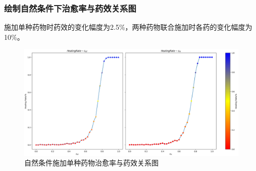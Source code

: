 \documentclass{ctexart}
\begin{document}
\subsubsection{绘制自然条件下治愈率与药效关系图}
施加单种药物时药效的变化幅度为2.5\%，两种药物联合施加时各药的变化幅度为10\%。
\begin{figure}[H]
    \centering
    \includegraphics[width=\linewidth]{7.1.png}
    \caption{自然条件施加单种药物治愈率与药效关系图}
    \label{fig.7.1}
\end{figure}
\end{document}
